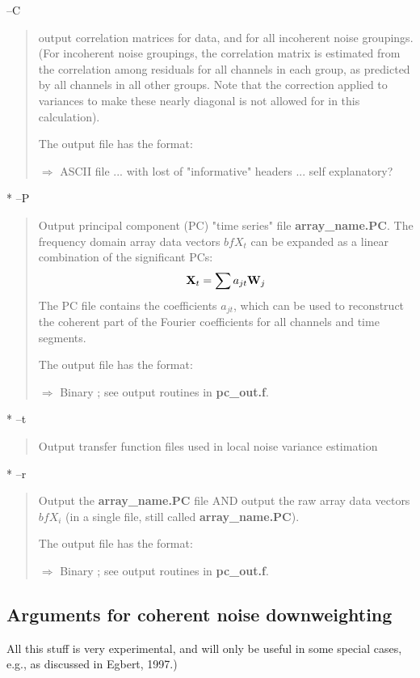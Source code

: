 --C
\begin{quote}
output correlation matrices for data, and for all incoherent noise groupings.
(For incoherent noise groupings, the correlation matrix is estimated from
the correlation among residuals for all channels in each group, as
predicted by all channels in all other groups.  Note that the correction
applied to variances to make these nearly diagonal is not allowed for in
this calculation).

The output file has the format:

$\Longrightarrow$ ASCII file ... with lost of "informative" headers ... self explanatory?
\end{quote}

* --P
\begin{quote}
Output principal component (PC) "time series" file {\bf array\_name.PC}.  The frequency domain array 
data vectors ${bf X}_t$ can be expanded as a linear combination of the significant PCs:
\begin{equation}
{\bf X}_t = \sum a_{jt} {\bf W}_j 
\end{equation}
The PC file contains the coefficients $a_{jt}$,
which can be used to reconstruct the coherent part
of the Fourier coefficients for all channels and time segments.

The output file has the format:

$\Longrightarrow$  Binary ;   see output routines in {\bf pc\_out.f}.
\end{quote}

* --t
\begin{quote}
Output transfer function files used in local noise variance estimation
\end{quote}
      
* --r
\begin{quote}
Output the {\bf array\_name.PC}
file AND output the raw array data vectors ${bf X}_i$ (in a single file,
still called {\bf array\_name.PC}).

The output file has the format:

$\Longrightarrow$  Binary ;   see output routines in {\bf  pc\_out.f}.
\end{quote}

\subsection{Arguments for coherent noise downweighting}

All this stuff is very experimental, and will only be useful in some
special cases, e.g., as discussed in Egbert, 1997.)

